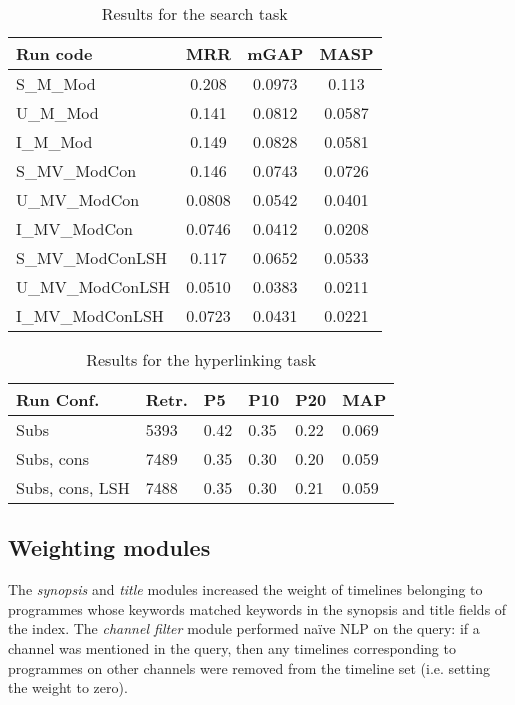 \documentclass{../acm_proc_article-me11_tweaked}
\begin{document}
\begin{table}
	\small
	\centering
	\caption{Results for the search task}
	\label{tbl:searchresults}
\begin{tabular}{|l|c|c|c|}
\hline
\textbf{Run code} & \textbf{MRR} &
\textbf{mGAP} &
\textbf{MASP} \\
\hline
S\_M\_Mod & 0.208 & 0.0973 & 0.113 \\ %
U\_M\_Mod & 0.141 & 0.0812 & 0.0587 \\ %
I\_M\_Mod & 0.149 & 0.0828 & 0.0581 \\ %
S\_MV\_ModCon & 0.146 & 0.0743 & 0.0726 \\ %
U\_MV\_ModCon & 0.0808 & 0.0542 & 0.0401 \\ %
I\_MV\_ModCon & 0.0746 & 0.0412 & 0.0208 \\ %
S\_MV\_ModConLSH & 0.117 & 0.0652 & 0.0533 \\ %
U\_MV\_ModConLSH & 0.0510 & 0.0383 & 0.0211 \\
I\_MV\_ModConLSH & 0.0723 & 0.0431 & 0.0221 \\ %
\hline
\end{tabular}
\end{table}

\begin{table}
	\small
\centering
\caption{Results for the hyperlinking task}
\label{tbl:hyperresults}
\begin{tabular}{|l|l|l|l|l|l|}
\hline
\textbf{Run Conf.} & \textbf{Retr.} & \textbf{P5} & \textbf{P10} &
\textbf{P20} & \textbf{MAP}\\
\hline
Subs & 5393 & 0.42 & 0.35 & 0.22 & 0.069\\
Subs, cons & 7489 & 0.35 & 0.30 & 0.20 & 0.059 \\
Subs, cons, LSH & 7488 & 0.35 & 0.30 & 0.21 & 0.059 \\
\hline
\end{tabular}
\end{table}

\subsection{Weighting modules}
The \emph{synopsis} and \emph{title} modules increased the weight of timelines belonging to programmes whose keywords matched keywords in the synopsis and title fields of the index. The \emph{channel filter} module performed naïve NLP on the query: if a channel was mentioned in the query, then any 
timelines corresponding to programmes on other channels were removed from the 
timeline set (i.e. setting the weight to zero).
\end{document}

